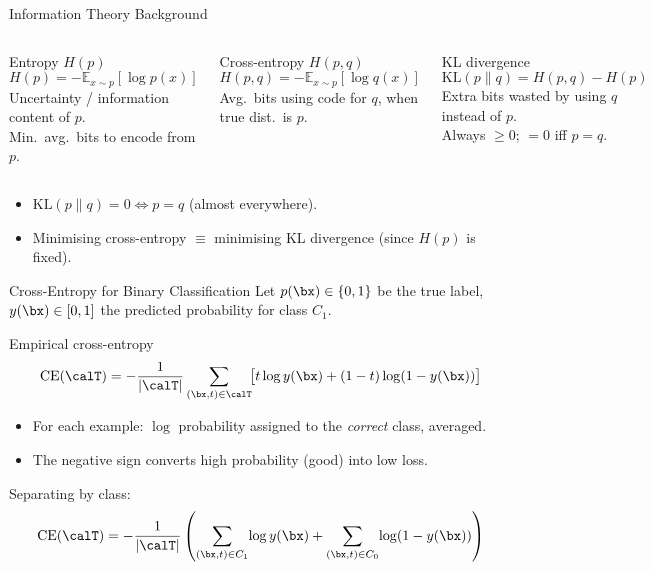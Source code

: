 \begin{frame}{Information Theory Background}
  \begin{columns}[t]
      \begin{block}{Entropy $H(p)$}
        \[ H(p)=-\mathbb{E}_{x\sim p}[\log p(x)] \]
        Uncertainty / information content of $p$.\\
        Min.\ avg.\ bits to encode from $p$.
      \end{block}
      \begin{block}{Cross-entropy $H(p,q)$}
        \[ H(p,q)=-\mathbb{E}_{x\sim p}[\log q(x)] \]
        Avg.\ bits using code for $q$, when true dist.\ is $p$.
      \end{block}
      \begin{block}{KL divergence}
        \[ \mathrm{KL}(p\|q)=H(p,q)-H(p) \]
        Extra bits wasted by using $q$ instead of $p$.\\
        Always $\geq 0$; $=0$ iff $p=q$.
      \end{block}
  \end{columns}
  \vspace{8pt}
  \begin{itemize}
    \item $\mathrm{KL}(p\|q)=0 \Leftrightarrow p=q$ (almost everywhere).
    \item Minimising cross-entropy $\equiv$ minimising KL divergence (since $H(p)$ is fixed).
  \end{itemize}
\end{frame}

\begin{frame}{Cross-Entropy for Binary Classification}
  Let $p(\bx)\in\{0,1\}$ be the true label, $y(\bx)\in[0,1]$ the predicted probability for class $C_1$.
  \begin{block}{Empirical cross-entropy}
    \[
      \mathrm{CE}(\calT)
      = -\frac{1}{|\calT|}
      \sum_{(\bx,t)\in\calT}\!
      \bigl[t\log y(\bx)+(1-t)\log(1-y(\bx))\bigr]
    \]
  \end{block}
  \begin{itemize}
    \item For each example: $\log$ probability assigned to the \emph{correct} class, averaged.
    \item The negative sign converts high probability (good) into low loss.
  \end{itemize}
  Separating by class:
  \[
    \mathrm{CE}(\calT)
    = -\frac{1}{|\calT|}
    \left(
      \sum_{(\bx,t)\in C_1}\!\log y(\bx)
      + \sum_{(\bx,t)\in C_0}\!\log(1-y(\bx))
    \right)
  \]
\end{frame}


